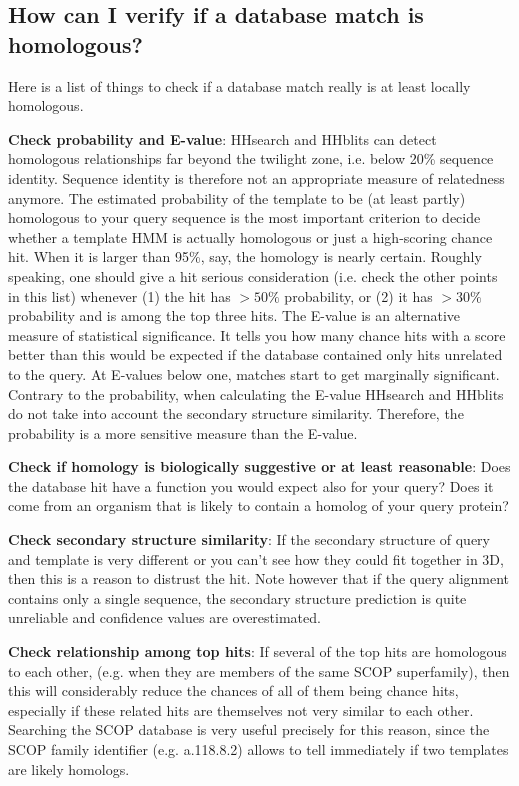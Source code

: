 \documentclass[11pt,a4paper]{article}
\begin{document}
\subsection{How can I verify if a database match is homologous?}
Here is a list of things to check if a database match really is at least locally homologous.
 
{\bf Check probability and E-value}:
HHsearch and HHblits can detect homologous relationships far beyond the twilight zone, i.e. below 20\% sequence identity. Sequence identity is therefore not an appropriate measure of relatedness anymore. The estimated probability of the template to be (at least partly) homologous to your query sequence is the most important criterion to decide whether a template HMM is actually homologous or just a high-scoring chance hit. When it is larger than 95\%, say, the homology is nearly certain. Roughly speaking, one should give a hit serious consideration (i.e. check the other points in this list) whenever (1) the hit has $>50\%$ probability, or (2) it has $>30\%$ probability and is among the top three hits. The E-value is an alternative measure of statistical significance. It tells you how many chance hits with a score better than this would be expected if the database contained only hits unrelated to the query. At E-values below one, matches start to get marginally significant. Contrary to the probability, when calculating the E-value HHsearch and HHblits do not take into account the secondary structure similarity. Therefore, the probability is a more sensitive measure than the E-value.

{\bf Check if homology is biologically suggestive or at least reasonable}:
Does the database hit have a function you would expect also for your query? Does it come from an organism that is likely to contain a homolog of your query protein?

{\bf Check secondary structure similarity}:
If the secondary structure of query and template is very different or you can't see how they could fit together in 3D, then this is a reason to distrust the hit. Note however that if the query alignment contains only a single sequence, the secondary structure prediction is quite unreliable and confidence values are overestimated.

{\bf Check relationship among top hits}: 
If several of the top hits are homologous to each other, (e.g. when they are members of the same SCOP superfamily), then this will considerably reduce the chances of all of them being chance hits, especially if these related hits are themselves not very similar to each other. Searching the SCOP database is very useful precisely for this reason, since the SCOP family identifier (e.g. a.118.8.2) allows to tell immediately if two templates are likely homologs.
\end{document}

